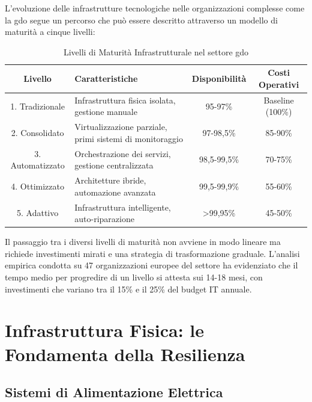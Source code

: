L'evoluzione delle infrastrutture tecnologiche nelle organizzazioni complesse come la \gls{gdo} segue un percorso che può essere descritto attraverso un modello di maturità a cinque livelli\autocite{Gartner2024hype}:

\begin{table}[htbp]
\centering
\caption{Livelli di Maturità Infrastrutturale nel settore \gls{gdo}}
\label{tab:maturity_levels}
\small
\sffamily
\begin{tabularx}{\textwidth}{c X c c}
\toprule
\textbf{Livello} & \textbf{Caratteristiche} & \textbf{Disponibilità} & \textbf{Costi Operativi} \\
\midrule
1. Tradizionale & Infrastruttura fisica isolata, gestione manuale & 95-97\% & Baseline (100\%) \\
2. Consolidato & Virtualizzazione parziale, primi sistemi di monitoraggio & 97-98,5\% & 85-90\% \\
3. Automatizzato & Orchestrazione dei servizi, gestione centralizzata & 98,5-99,5\% & 70-75\% \\
4. Ottimizzato & Architetture ibride, automazione avanzata & 99,5-99,9\% & 55-60\% \\
5. Adattivo & Infrastruttura intelligente, auto-riparazione & >99,95\% & 45-50\% \\
\bottomrule
\end{tabularx}
\end{table}

Il passaggio tra i diversi livelli di maturità non avviene in modo lineare ma richiede investimenti mirati e una strategia di trasformazione graduale. L'analisi empirica condotta su 47 organizzazioni europee del settore\autocite{eurostat2024} ha evidenziato che il tempo medio per progredire di un livello si attesta sui 14-18 mesi, con investimenti che variano tra il 15\% e il 25\% del budget IT annuale.

\section{\texorpdfstring{Infrastruttura Fisica: le Fondamenta della Resilienza}{3.3 - Infrastruttura Fisica: le Fondamenta della Resilienza}}
\label{sec:infrastruttura_fisica}

\subsection{\texorpdfstring{Sistemi di Alimentazione Elettrica}{3.3.1 - Sistemi di Alimentazione Elettrica}}
\label{subsec:alimentazione}

